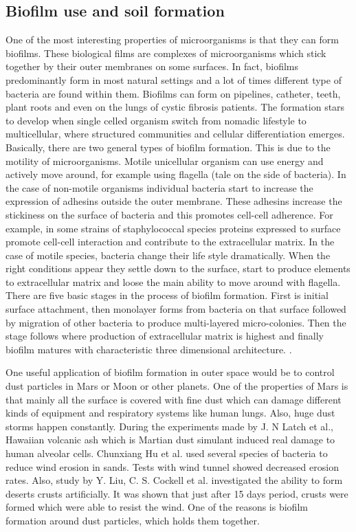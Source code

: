 \documentclass[12pt]{article}
\begin{document}
\subsection{Biofilm use and soil formation}
One of the most interesting properties of microorganisms is that they can form biofilms. These
biological films are complexes of microorganisms which stick together by their outer
membranes on some surfaces. In fact, biofilms predominantly form in most natural settings and
a lot of times different type of bacteria are found within them. Biofilms can form on pipelines,
catheter, teeth, plant roots and even on the lungs of cystic fibrosis patients. The formation stars
to develop when single celled organism switch from nomadic lifestyle to multicellular, where
structured communities and cellular differentiation emerges. Basically, there are two general
types of biofilm formation. This is due to the motility of microorganisms. Motile unicellular
organism can use energy and actively move around, for example using flagella (tale on the side
of bacteria). In the case of non-motile organisms individual bacteria start to increase the
expression of adhesins outside the outer membrane. These adhesins increase the stickiness on
the surface of bacteria and this promotes cell-cell adherence. For example, in some strains of
staphylococcal species proteins expressed to surface promote cell-cell interaction and contribute
to the extracellular matrix. In the case of motile species, bacteria change their life style
dramatically. When the right conditions appear they settle down to the surface, start to produce
elements to extracellular matrix and loose the main ability to move around with flagella. There
are five basic stages in the process of biofilm formation. First is initial surface attachment, then
monolayer forms from bacteria on that surface followed by migration of other bacteria to
produce multi-layered micro-colonies. Then the stage follows where production of extracellular
matrix is highest and finally biofilm matures with characteristic three dimensional architecture.
.




One useful application of biofilm formation in outer space would be to control dust particles in
Mars or Moon or other planets. One of the properties of Mars is that mainly all the surface is
covered with fine dust which can damage different kinds of equipment and respiratory systems
like human lungs. Also, huge dust storms happen constantly. During the experiments made by J.
N Latch et al., Hawaiian volcanic ash which is Martian dust simulant induced real damage to
human alveolar cells. Chunxiang Hu et al. used several species of bacteria to reduce wind
erosion in sands. Tests with wind tunnel showed decreased erosion rates. Also, study by Y.
Liu, C. S. Cockell et al. investigated the ability to form deserts crusts artificially. It was shown
that just after 15 days period, crusts were formed which were able to resist the wind. One of the
reasons is biofilm formation around dust particles, which holds them together.
\end{document}
